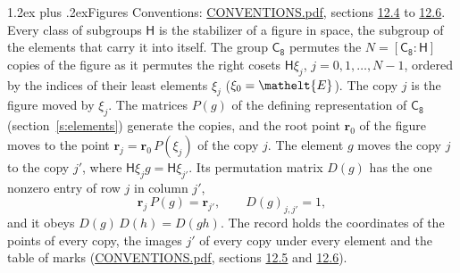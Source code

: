 \documentclass[10pt,a4paper]{article}
\makeatletter
\renewcommand\section{\@startsection{section}{1}{\z@}{-3ex plus -1ex minus -.2ex}%
  {1.2ex plus .2ex}{\normalfont\large\sffamily\bfseries\color{parttitle}}}
\numberwithin{equation}{section}
\newcommand{\eltfont}[1]{{\let\sigma\eltsigma\mathelt{#1}}}
\newcommand{\grp}[1]{\mathsf{#1}}
\newcommand{\cls}[1]{\eltfont{#1}}
\newcommand{\pointr}{\mathbf{r}}
\makeatother
\begin{document}
\section{Figures}\label{s:permutation}
Conventions: \href{../../CONVENTIONS.pdf}{CONVENTIONS.pdf}, sections \href{../../CONVENTIONS.pdf\#conv.12.4}{12.4} to \href{../../CONVENTIONS.pdf\#conv.12.6}{12.6}.
Every class of subgroups $\grp{H}$ is the stabilizer of a figure in space, the subgroup of the elements that carry it into itself. \label{n:local.orbit.size}\label{n:element.coset.least}\label{n:index.coset}The group $\grp{C_{8}}$ permutes the $N = [\grp{C_{8}} : \grp{H}]$ copies of the figure as it permutes the right cosets $\grp{H}\xi_j$, $j = 0, 1, \dots, N - 1$, ordered by the indices of their least elements $\xi_j$ ($\xi_0 = \cls{E}$). The copy $j$ is the figure moved by $\xi_j$. The matrices $P(g)$ of the defining representation of $\grp{C_{8}}$ (section~\ref{s:elements}) generate the copies, and the root point $\pointr_0$ of the figure moves to the point $\pointr_j = \pointr_0\, P(\xi_j)$ of the copy $j$. \label{n:local.coset.image}The element $g$ moves the copy $j$ to the copy $j'$, where $\grp{H}\xi_j g = \grp{H}\xi_{j'}$. \label{n:local.matrix.permutation}Its permutation matrix $D(g)$ has the one nonzero entry of row $j$ in column $j'$,
\begin{equation}\label{e:perm.matrix}\pointr_j\, P(g) = \pointr_{j'}, \qquad D(g)_{j,j'} = 1,\end{equation}
and it obeys $D(g)\, D(h) = D(gh)$. The record holds the coordinates of the points of every copy, the images $j'$ of every copy under every element and the table of marks (\href{../../CONVENTIONS.pdf}{CONVENTIONS.pdf}, sections \href{../../CONVENTIONS.pdf\#conv.12.5}{12.5} and \href{../../CONVENTIONS.pdf\#conv.12.6}{12.6}).
\end{document}
